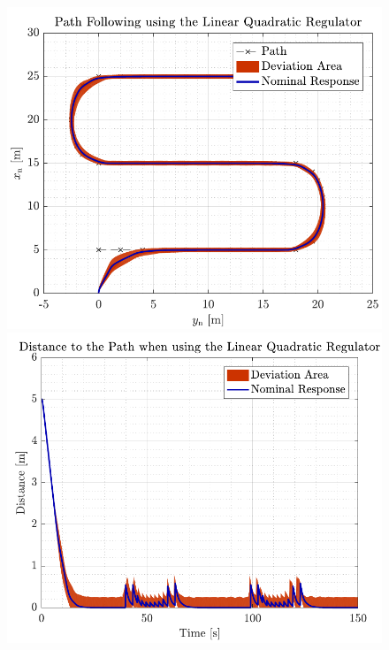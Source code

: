 \begin{figure}[H]
    \captionbox 
    {   
        \label{fig:path_lqr_no_correc}
    }                                                                 
    {                                                                  
        \includegraphics[width=.45\textwidth]{figures/path_lqr_no_correc}         
    }                                                                    
    \hspace{5pt}                                                          
    \captionbox  
    {      
        \label{fig:dist_lqr_no_correc}
    }                                                                          
    {
        \includegraphics[width=.45\textwidth]{figures/dist_lqr_no_correc}
    }
\end{figure}

